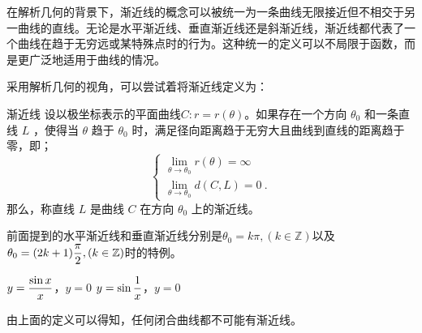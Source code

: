 在解析几何的背景下，渐近线的概念可以被统一为一条曲线无限接近但不相交于另一曲线的直线。无论是水平渐近线、垂直渐近线还是斜渐近线，渐近线都代表了一个曲线在趋于无穷远或某特殊点时的行为。这种统一的定义可以不局限于函数，而是更广泛地适用于曲线的情况。

采用解析几何的视角，可以尝试着将渐近线定义为：

\begin{definition}{渐近线}
设以极坐标表示的平面曲线$C:r=r(\theta)$。如果存在一个方向  $\theta_0$  和一条直线  $L$ ，使得当  $\theta$  趋于  $\theta_0$  时，满足径向距离趋于无穷大且曲线到直线的距离趋于零，即；
\begin{equation}
\begin{cases}
\displaystyle\lim_{\theta \to \theta_0} r(\theta) = \infty\\
\displaystyle\lim_{\theta \to \theta_0} d(C, L) = 0~.
\end{cases}
\end{equation}
那么，称直线  $L$  是曲线  $C$  在方向  $\theta_0$  上的渐近线。
\end{definition}

前面提到的水平渐近线和垂直渐近线分别是$\theta_0=k\pi,(k\in\mathbb{Z})$以及$\displaystyle\theta_0=(2k+1){\pi\over2},(k\in\mathbb{Z})$时的特例。

$\displaystyle y={\sin x\over x}$，$y=0$
$\displaystyle y=\sin {1\over x}$，$y=0$

由上面的定义可以得知，任何闭合曲线都不可能有渐近线。